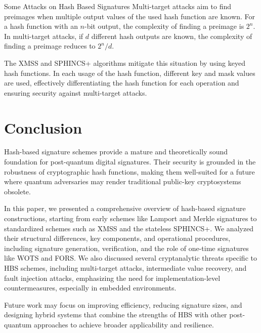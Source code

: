 \begin{section}{Some Attacks on Hash Based Signatures}
Multi-target attacks aim to find preimages when multiple output values of the used hash function are known. For a hash function with an $n$-bit output, the complexity of finding a preimage is $2^n$. In multi-target attacks, if $d$ different hash outputs are known, the complexity of finding a preimage reduces to $2^n / d$.

The XMSS and SPHINCS+ algorithms mitigate this situation by using keyed hash functions. In each usage of the hash function, different key and mask values are used, effectively differentiating the hash function for each operation and ensuring security against multi-target attacks.



\end{section}

\section{Conclusion}

Hash-based signature schemes provide a mature and theoretically sound foundation for post-quantum digital signatures. Their security is grounded in the robustness of cryptographic hash functions, making them well-suited for a future where quantum adversaries may render traditional public-key cryptosystems obsolete. 

In this paper, we presented a comprehensive overview of hash-based signature constructions, starting from early schemes like Lamport and Merkle signatures to standardized schemes such as XMSS and the stateless SPHINCS+. We analyzed their structural differences, key components, and operational procedures, including signature generation, verification, and the role of one-time signatures like WOTS and FORS. We also discussed several cryptanalytic threats specific to HBS schemes, including multi-target attacks, intermediate value recovery, and fault injection attacks, emphasizing the need for implementation-level countermeasures, especially in embedded environments.

Future work may focus on improving efficiency, reducing signature sizes, and designing hybrid systems that combine the strengths of HBS with other post-quantum approaches to achieve broader applicability and resilience.
